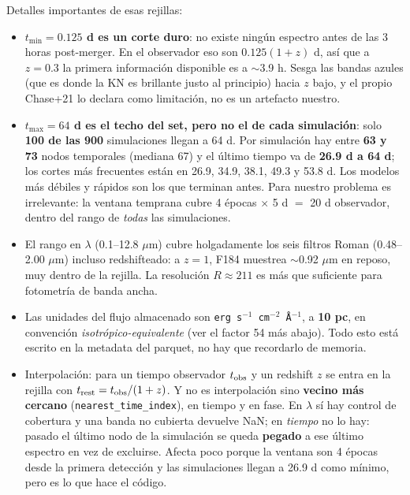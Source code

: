 \documentclass[11pt,a4paper]{article}
\newcommand{\code}[1]{\texttt{\small #1}}
\begin{document}
Detalles importantes de esas rejillas:

\begin{itemize}
  \item \textbf{$t_{\min} = 0.125$ d es un corte duro}: no existe ningún espectro antes de las 3
        horas post-merger. En el observador eso son $0.125(1+z)$ d, así que a $z=0.3$ la primera
        información disponible es a $\sim$3.9 h. Sesga las bandas azules (que es donde la KN es
        brillante justo al principio) hacia $z$ bajo, y el propio Chase+21 lo declara como
        limitación, no es un artefacto nuestro.
  \item \textbf{$t_{\max} = 64$ d es el techo del set, pero no el de cada simulación}: solo
        \textbf{100 de las 900} simulaciones llegan a 64 d. Por simulación hay entre \textbf{63 y 73}
        nodos temporales (mediana 67) y el último tiempo va de \textbf{26.9 d a 64 d}; los cortes
        más frecuentes están en 26.9, 34.9, 38.1, 49.3 y 53.8 d. Los modelos más débiles y rápidos
        son los que terminan antes. Para nuestro problema es irrelevante: la ventana temprana cubre
        4 épocas $\times$ 5 d $=$ 20 d observador, dentro del rango de \emph{todas} las
        simulaciones.
  \item El rango en $\lambda$ (0.1--12.8 $\mu$m) cubre holgadamente los seis filtros Roman
        (0.48--2.00 $\mu$m) incluso redshifteado: a $z=1$, F184 muestrea $\sim$0.92 $\mu$m en
        reposo, muy dentro de la rejilla. La resolución $R\approx211$ es más que suficiente para
        fotometría de banda ancha.
  \item Las unidades del flujo almacenado son \code{erg s$^{-1}$ cm$^{-2}$ \AA$^{-1}$}, a
        \textbf{10 pc}, en convención \emph{isotrópico-equivalente} (ver el factor 54 más abajo).
        Todo esto está escrito en la metadata del parquet, no hay que recordarlo de memoria.
  \item Interpolación: para un tiempo observador $t_{\rm obs}$ y un redshift $z$ se entra en la
        rejilla con $t_{\rm rest} = t_{\rm obs}/(1+z)$. Y no es interpolación sino \textbf{vecino más
        cercano} (\code{nearest\_time\_index}), en tiempo y en fase. En $\lambda$ sí hay control de
        cobertura y una banda no cubierta devuelve NaN; en \emph{tiempo} no lo hay: pasado el último
        nodo de la simulación se queda \textbf{pegado} a ese último espectro en vez de excluirse.
        Afecta poco porque la ventana son 4 épocas desde la primera detección y las simulaciones
        llegan a 26.9 d como mínimo, pero es lo que hace el código.
\end{itemize}
\end{document}
